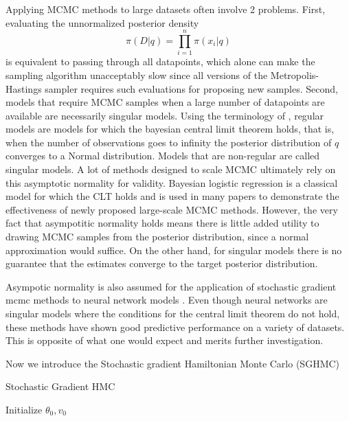 \documentclass[12pt]{report}
\begin{document}
Applying MCMC methods to large datasets often involve 2 problems. First, evaluating the unnormalized posterior density
\[ \pi(D|q) = \prod_{i=1}^n \pi(x_i|q) \]
 is equivalent to passing through all datapoints, which alone can make the sampling algorithm unacceptably slow since all versions of the Metropolis-Hastings sampler requires such evaluations for proposing new samples. Second, models that require MCMC samples when a large number of datapoints are available are necessarily singular models. Using the terminology of \cite{watanabe2009algebraic}, regular models are models for which the bayesian central limit theorem \cite{le2012asymptotic} holds, that is, when the number of observations goes to infinity the posterior distribution of $q$ converges to a Normal distribution. Models that are non-regular are called singular models. A lot of methods designed to scale MCMC \cite{neiswanger2013asymptotically,scott2016bayes} ultimately rely on this asymptotic normality for validity. Bayesian logistic regression is a classical model for which the CLT holds and is used in many papers to demonstrate the effectiveness of newly proposed large-scale MCMC methods. However, the very fact that asympotitic normality holds means there is little added utility to drawing MCMC samples from the posterior distribution, since a normal approximation would suffice. On the other hand, for singular models there is no guarantee that the estimates converge to the target posterior distribution. 

Asympotic normality is also assumed for the application of stochastic gradient mcmc methods to neural network models \cite{welling2011bayesian,chen2014stochastic,ahn2012bayesian,ding2014bayesian,ma2015complete}. Even though neural networks are singular models where the conditions for the central limit theorem do not hold, these methods have shown good predictive performance on a variety of datasets. This is opposite of what one would expect and merits further investigation.


Now we introduce the Stochastic gradient Hamiltonian Monte Carlo (SGHMC) \cite{chen2014stochastic}


\begin{algorithm}
    \caption{Stochastic Gradient HMC}
        Initialize $\theta_0,v_0$ \;
\end{algorithm}
\end{document}
